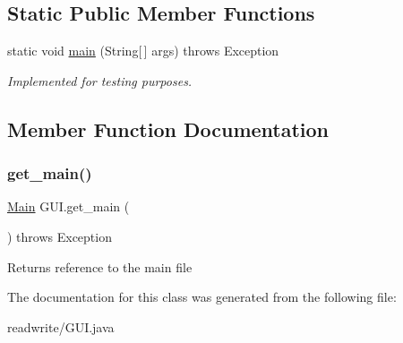 \subsection*{Static Public Member Functions}
\begin{DoxyCompactItemize}
\item 
\mbox{\label{class_g_u_i_a8202c223d5b25c7dd94ce70bd6a267ac}} 
static void \hyperlink{class_g_u_i_a8202c223d5b25c7dd94ce70bd6a267ac}{main} (String\mbox{[}$\,$\mbox{]} args)  throws Exception 
\begin{DoxyCompactList}\small\item\em Implemented for testing purposes. \end{DoxyCompactList}\end{DoxyCompactItemize}


\subsection{Member Function Documentation}
\mbox{\label{class_g_u_i_abd66813fa465e8cc1f992b250fe1df5b}} 
\subsubsection{\texorpdfstring{get\+\_\+main()}{get\_main()}}
{\footnotesize\ttfamily \hyperlink{class_main}{Main} G\+U\+I.\+get\+\_\+main (\begin{DoxyParamCaption}{ }\end{DoxyParamCaption}) throws Exception}

\begin{DoxyReturn}{Returns}
reference to the main file 
\end{DoxyReturn}


The documentation for this class was generated from the following file\+:\begin{DoxyCompactItemize}
\item 
readwrite/G\+U\+I.\+java\end{DoxyCompactItemize}
